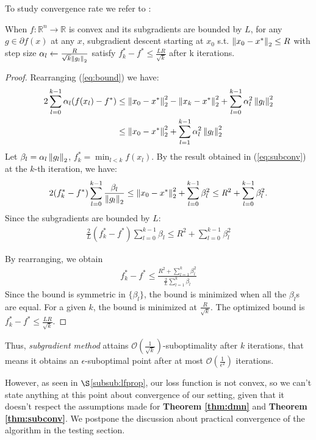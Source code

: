 To study convergence rate we refer to \parencite[Theorem 3.1]{notes_subgrad}:
\begin{thm}
\label{thm:subconv}
When $f:\mathbb{R}^n\to\mathbb{R}$ is convex and its subgradients are bounded by $L$, for any $g \in \partial f(x)$ at any $x$, subgradient descent starting at $x_0$ s.t. $\left\lVert x_0 - x^* \right\rVert_2 \leq R$ with step size $\alpha_l \leftarrow \frac{R}{\sqrt{k}\left\lVert g_l \right\rVert_2}$ satisfy $f^*_k - f^* \leq \frac{LR}{\sqrt{k}}$ after k iterations.
\end{thm}
\begin{proof}
Rearranging (\ref{eq:bound}) we have:
\begin{align}
\begin{split}
\label{eq:subconv}
    2\sum_{l=0}^{k-1}\alpha_l(f(x_l) - f^*) &\leq \left\lVert x_0 - x^* \right\rVert_2^2 - \left\lVert x_k - x^* \right\rVert_2^2 + \sum_{l=0}^{k-1}\alpha_l^2\left\lVert g_l \right\rVert_2^2\\
    & \leq \left\lVert x_0 - x^* \right\rVert_2^2 + \sum_{l=1}^{k-1}\alpha_l^2\left\lVert g_l \right\rVert_2^2
\end{split}
\end{align}
Let $\beta_l=\alpha_l\left\lVert g_l \right\rVert_2$, $f_k^* = \min_{l<k}f(x_l)$. By the result obtained in (\ref{eq:subconv}) at the $k$-th iteration, we have:
\begin{align*}
    2(f_k^* - f^*)\sum_{l=0}^{k-1}\frac{\beta_l}{\left\lVert g_l \right\rVert_2} \leq \left\lVert x_0 - x^* \right\rVert_2^2 + \sum_{l=0}^{k-1}\beta_l^2 \leq \mathit{R}^2 + \sum_{l=0}^{k-1}\beta_l^2.
\end{align*}
Since the subgradients are bounded by $L$:
\begin{align*}
    \frac{2}{L}(f_k^* - f^*)\sum_{l=0}^{k-1}\beta_l \leq \mathit{R}^2+\sum_{l=0}^{k-1}\beta_l^2
\end{align*}

By rearranging, we obtain
\begin{align*}
    f_k^* - f^* \leq \frac{R^2+\sum_{l=1}^{k}\beta_l^2}{\frac{2}{L}\sum_{l=1}^k\beta_l}
\end{align*}
Since the bound is symmetric in $\{\beta_l\}$, the bound is minimized when all the $\beta_l$s are equal. For a given $k$, the bound is minimized at $\frac{R}{\sqrt{k}}$. The optimized bound is $f_k^* - f^* \leq \frac{LR}{\sqrt{k}}$.
\end{proof}
Thus, \textit{subgradient method} attains $\mathcal{O}(\frac{1}{\sqrt{k}})$-suboptimality after $k$ iterations, that means it obtains an {$\epsilon$-suboptimal} point after at most $\mathcal{O}(\frac{1}{\epsilon^2})$ iterations.

However, as seen in $\S$\ref{subsub:lfprop}, our loss function is not convex, so we can't state anything at this point about convergence of our setting, given that it doesn't respect the assumptions made for \textbf{Theorem \ref{thm:dmn}} and \textbf{Theorem \ref{thm:subconv}}. We postpone the discussion about practical convergence of the algorithm in the testing section.

